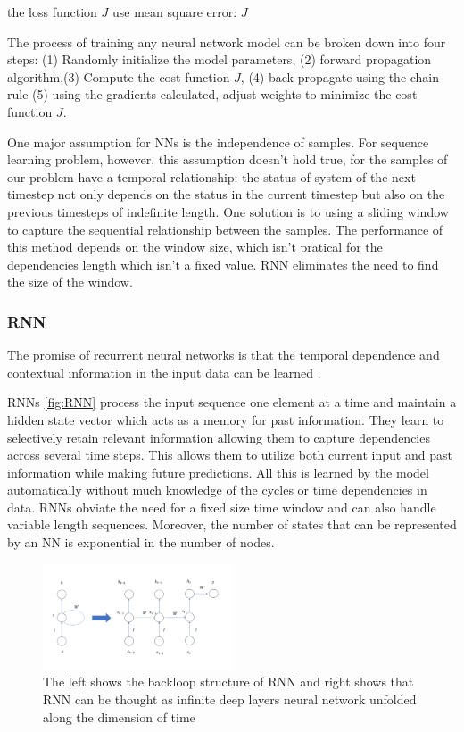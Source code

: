 \documentclass[5p]{elsarticle}
\begin{document}
the loss function $J$ use mean square error:
    $J$

The process of training any neural network model can be broken down into four steps: (1) Randomly initialize the model parameters, (2) forward propagation algorithm,(3) Compute the cost function $J$, (4) back propagate using the chain rule  (5) using the gradients calculated, adjust weights to minimize the cost function $J$.

One major assumption for NNs is the independence of samples. For sequence learning problem, however, this assumption doesn't hold true, for the samples of our problem have a temporal relationship: the status of system of the next timestep not only depends on the status in the current timestep but also on the previous timesteps of indefinite length. One solution is to using a sliding window to capture the sequential relationship between the samples. The performance of this method depends on the window size, which isn't pratical for the dependencies length which isn't a fixed value. RNN eliminates the need to find the size of the window\cite{HermansTrainingNetworks}. 

\subsubsection{RNN}
The promise of recurrent neural networks is that the temporal dependence and contextual
information in the input data can be learned\cite{Bengio1994LearningDifficult} \cite{ChoLearningTranslation}. 

RNNs \ref{fig:RNN} process the input sequence one element at a time and maintain a hidden
state vector which acts as a memory for past information. They learn to selectively retain relevant information allowing them to capture dependencies across several time steps. This allows them to utilize both current input and past information while making future predictions. All this is learned by the model automatically without much knowledge of the cycles or time dependencies in data. RNNs obviate the need for a fixed size time window and can also handle variable length sequences. Moreover, the number of states that can be represented by an NN is exponential in the number of nodes.

 
\begin{figure}[h]
    \centering
    \includegraphics[width=0.5\textwidth]{RNN.png}
    \caption{The left shows the backloop structure of RNN and right shows that RNN can be thought as infinite deep layers neural network unfolded along the dimension of time}
    \label{fig:RNN can be thought as infinite deep layers neural network along the dimensions of time}
\end{figure}
\end{document}
